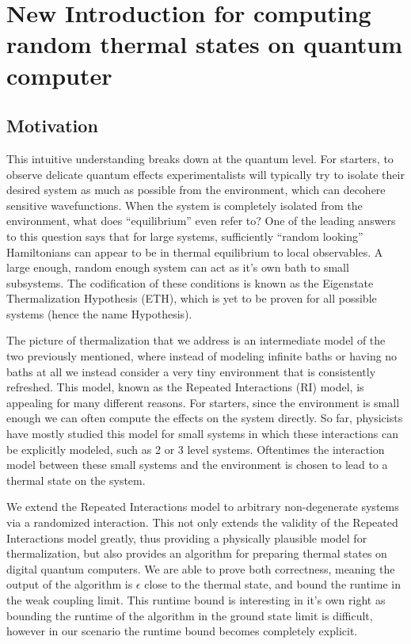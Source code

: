 \chapter{New Introduction for computing random thermal states on quantum computer}
\section{Motivation}

This intuitive understanding breaks down at the quantum level. For starters, to observe delicate quantum effects experimentalists will typically try to isolate their desired system as much as possible from the environment, which can decohere sensitive wavefunctions. When the system is completely isolated from the environment, what does ``equilibrium'' even refer to? One of the leading answers to this question says that for large systems, sufficiently ``random looking'' Hamiltonians can appear to be in thermal equilibrium to local observables. A large enough, random enough system can act as it's own bath to small subsystems. The codification of these conditions is known as the Eigenstate Thermalization Hypothesis (ETH), which is yet to be proven for all possible systems (hence the name Hypothesis).

The picture of thermalization that we address is an intermediate model of the two previously mentioned, where instead of modeling infinite baths or having no baths at all we instead consider a very tiny environment that is consistently refreshed. This model, known as the Repeated Interactions (RI) model, is appealing for many different reasons. For starters, since the environment is small enough we can often compute the effects on the system directly. So far, physicists have mostly studied this model for small systems in which these interactions can be explicitly modeled, such as 2 or 3 level systems. Oftentimes the interaction model between these small systems and the environment is chosen to lead to a thermal state on the system.

We extend the Repeated Interactions model to arbitrary non-degenerate systems via a randomized interaction. This not only extends the validity of the Repeated Interactions model greatly, thus providing a physically plausible model for thermalization, but also provides an algorithm for preparing thermal states on digital quantum computers. We are able to prove both correctness, meaning the output of the algorithm is $\epsilon$ close to the thermal state, and bound the runtime in the weak coupling limit. This runtime bound is interesting in it's own right as bounding the runtime of the algorithm in the ground state limit is difficult, however in our scenario the runtime bound becomes completely explicit. 

